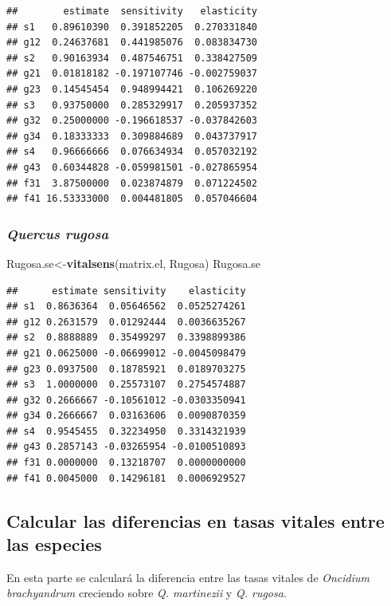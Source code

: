 \documentclass[
]{book}
\newenvironment{Shaded}{\begin{snugshade}}{\end{snugshade}}
\newcommand{\FunctionTok}[1]{\textcolor[rgb]{0.13,0.29,0.53}{\textbf{#1}}}
\newcommand{\NormalTok}[1]{#1}
\newcommand{\OtherTok}[1]{\textcolor[rgb]{0.56,0.35,0.01}{#1}}
\theoremstyle{definition}
\theoremstyle{definition}
\theoremstyle{definition}
\theoremstyle{definition}
\theoremstyle{remark}
\begin{document}
\begin{verbatim}
##        estimate  sensitivity   elasticity
## s1   0.89610390  0.391852205  0.270331840
## g12  0.24637681  0.441985076  0.083834730
## s2   0.90163934  0.487546751  0.338427509
## g21  0.01818182 -0.197107746 -0.002759037
## g23  0.14545454  0.948994421  0.106269220
## s3   0.93750000  0.285329917  0.205937352
## g32  0.25000000 -0.196618537 -0.037842603
## g34  0.18333333  0.309884689  0.043737917
## s4   0.96666666  0.076634934  0.057032192
## g43  0.60344828 -0.059981501 -0.027865954
## f31  3.87500000  0.023874879  0.071224502
## f41 16.53333000  0.004481805  0.057046604
\end{verbatim}

\subsubsection{\texorpdfstring{\emph{Quercus rugosa}}{Quercus rugosa}}\label{quercus-rugosa}

\begin{Shaded}
\begin{Highlighting}[]
\NormalTok{Rugosa.se}\OtherTok{\textless{}{-}}\FunctionTok{vitalsens}\NormalTok{(matrix.el, Rugosa)}
\NormalTok{Rugosa.se}
\end{Highlighting}
\end{Shaded}

\begin{verbatim}
##      estimate sensitivity    elasticity
## s1  0.8636364  0.05646562  0.0525274261
## g12 0.2631579  0.01292444  0.0036635267
## s2  0.8888889  0.35499297  0.3398899386
## g21 0.0625000 -0.06699012 -0.0045098479
## g23 0.0937500  0.18785921  0.0189703275
## s3  1.0000000  0.25573107  0.2754574887
## g32 0.2666667 -0.10561012 -0.0303350941
## g34 0.2666667  0.03163606  0.0090870359
## s4  0.9545455  0.32234950  0.3314321939
## g43 0.2857143 -0.03265954 -0.0100510893
## f31 0.0000000  0.13218707  0.0000000000
## f41 0.0045000  0.14296181  0.0006929527
\end{verbatim}

\subsection{Calcular las diferencias en tasas vitales entre las especies}\label{calcular-las-diferencias-en-tasas-vitales-entre-las-especies}

En esta parte se calculará la diferencia entre las tasas vitales de \emph{Oncidium brachyandrum} creciendo sobre \emph{Q. martinezii} y \emph{Q. rugosa}.
\end{document}
